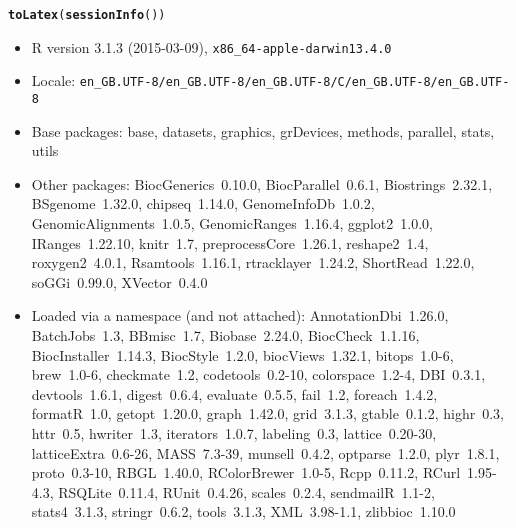 \documentclass[12pt]{article}\usepackage[]{graphicx}\usepackage[usenames,dvipsnames]{color}
\makeatletter
\newcommand{\hlstd}[1]{\textcolor[rgb]{0.345,0.345,0.345}{#1}}%
\newcommand{\hlkwd}[1]{\textcolor[rgb]{0.737,0.353,0.396}{\textbf{#1}}}%
\newenvironment{kframe}{%
 \def\at@end@of@kframe{}%
 \ifinner\ifhmode%
  \def\at@end@of@kframe{\end{minipage}}%
  \begin{minipage}{\columnwidth}%
 \fi\fi%
 \def\FrameCommand##1{\hskip\@totalleftmargin \hskip-\fboxsep
 \colorbox{shadecolor}{##1}\hskip-\fboxsep
     \hskip-\linewidth \hskip-\@totalleftmargin \hskip\columnwidth}%
 \MakeFramed {\advance\hsize-\width
   \@totalleftmargin\z@ \linewidth\hsize
   \@setminipage}}%
 {\par\unskip\endMakeFramed%
 \at@end@of@kframe}
\makeatother
\begin{document}
\newpage



\begin{kframe}
\begin{alltt}
\hlkwd{toLatex}\hlstd{(}\hlkwd{sessionInfo}\hlstd{())}
\end{alltt}
\end{kframe}\begin{itemize}\raggedright
  \item R version 3.1.3 (2015-03-09), \verb|x86_64-apple-darwin13.4.0|
  \item Locale: \verb|en_GB.UTF-8/en_GB.UTF-8/en_GB.UTF-8/C/en_GB.UTF-8/en_GB.UTF-8|
  \item Base packages: base, datasets, graphics, grDevices, methods,
    parallel, stats, utils
  \item Other packages: BiocGenerics~0.10.0, BiocParallel~0.6.1,
    Biostrings~2.32.1, BSgenome~1.32.0, chipseq~1.14.0,
    GenomeInfoDb~1.0.2, GenomicAlignments~1.0.5, GenomicRanges~1.16.4,
    ggplot2~1.0.0, IRanges~1.22.10, knitr~1.7, preprocessCore~1.26.1,
    reshape2~1.4, roxygen2~4.0.1, Rsamtools~1.16.1, rtracklayer~1.24.2,
    ShortRead~1.22.0, soGGi~0.99.0, XVector~0.4.0
  \item Loaded via a namespace (and not attached):
    AnnotationDbi~1.26.0, BatchJobs~1.3, BBmisc~1.7, Biobase~2.24.0,
    BiocCheck~1.1.16, BiocInstaller~1.14.3, BiocStyle~1.2.0,
    biocViews~1.32.1, bitops~1.0-6, brew~1.0-6, checkmate~1.2,
    codetools~0.2-10, colorspace~1.2-4, DBI~0.3.1, devtools~1.6.1,
    digest~0.6.4, evaluate~0.5.5, fail~1.2, foreach~1.4.2, formatR~1.0,
    getopt~1.20.0, graph~1.42.0, grid~3.1.3, gtable~0.1.2, highr~0.3,
    httr~0.5, hwriter~1.3, iterators~1.0.7, labeling~0.3,
    lattice~0.20-30, latticeExtra~0.6-26, MASS~7.3-39, munsell~0.4.2,
    optparse~1.2.0, plyr~1.8.1, proto~0.3-10, RBGL~1.40.0,
    RColorBrewer~1.0-5, Rcpp~0.11.2, RCurl~1.95-4.3, RSQLite~0.11.4,
    RUnit~0.4.26, scales~0.2.4, sendmailR~1.1-2, stats4~3.1.3,
    stringr~0.6.2, tools~3.1.3, XML~3.98-1.1, zlibbioc~1.10.0
\end{itemize}
\end{document}
